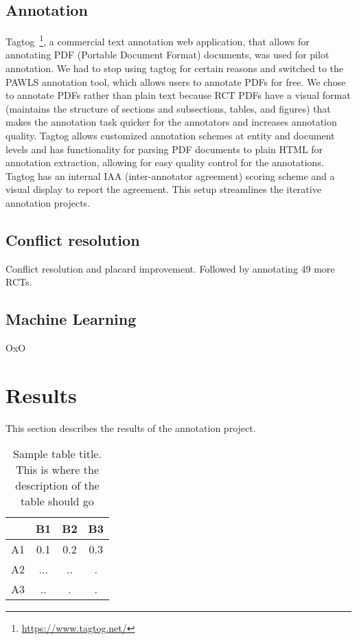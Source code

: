 \documentclass[sn-mathphys,Numbered]{sn-jnl}%
\theoremstyle{thmstyleone}%
\theoremstyle{thmstyletwo}%
\theoremstyle{thmstylethree}%
\begin{document}
\subsection{Annotation}
\label{annotation}
%
Tagtog~\footnote{\url{https://www.tagtog.net/}}, a commercial text annotation web application, that allows for annotating PDF (Portable Document Format) documents, was used for pilot annotation.
We had to stop using tagtog for certain reasons and switched to the PAWLS annotation tool, which allows users to annotate PDFs for free.
We chose to annotate PDFs rather than plain text because RCT PDFs have a visual format (maintains the structure of sections and subsections, tables, and figures) that makes the annotation task quicker for the annotators and increases annotation quality.
Tagtog allows customized annotation schemes at entity and document levels and has functionality for parsing PDF documents to plain HTML for annotation extraction, allowing for easy quality control for the annotations.
Tagtog has an internal IAA (inter-annotator agreement) scoring scheme and a visual display to report the agreement.
This setup streamlines the iterative annotation projects.
%
%
%
\subsection{Conflict resolution}
\label{conflicts}
%
Conflict resolution and placard improvement.
Followed by annotating 49 more RCTs.
%
%
%
\subsection{Machine Learning}
\label{ml}
%
OxO
%
%
%
\section{Results}
\label{sec:results}
%
This section describes the results of the annotation project.
\begin{table}[h!]
\caption{Sample table title. This is where the description of the table should go}
  \begin{tabular}{cccc}
    \hline
    & B1  &B2   & B3\\ \hline
    A1 & 0.1 & 0.2 & 0.3\\
    A2 & ... & ..  & .\\
    A3 & ..  & .   & .\\ \hline
  \end{tabular}
\end{table}
\end{document}

